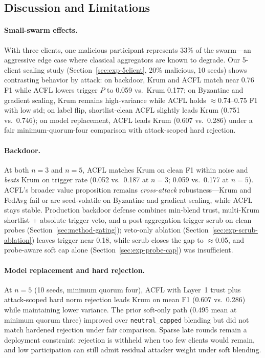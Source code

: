 \subsection{Discussion and Limitations}
\label{sec:exp-limitations}

\paragraph{Small-swarm effects.}
With three clients, one malicious participant represents 33\% of the swarm---an aggressive edge case where classical aggregators are known to degrade.
Our 5-client scaling study (Section~\ref{sec:exp-5client}, 20\% malicious, 10 seeds) shows contrasting behavior by attack: on backdoor, Krum and ACFL match near 0.76 F1 while ACFL lowers trigger $P$ to 0.059 vs.\ Krum 0.177; on Byzantine and gradient scaling, Krum remains high-variance while ACFL holds $\approx$0.74--0.75 F1 with low std; on label flip, shortlist-clean ACFL slightly leads Krum (0.751 vs.\ 0.746); on model replacement, ACFL leads Krum (0.607 vs.\ 0.286) under a fair minimum-quorum-four comparison with attack-scoped hard rejection.

\paragraph{Backdoor.}
At both $n{=}3$ and $n{=}5$, ACFL matches Krum on clean F1 within noise and \emph{beats} Krum on trigger rate (0.052 vs.\ 0.187 at $n{=}3$; 0.059 vs.\ 0.177 at $n{=}5$).
ACFL's broader value proposition remains \emph{cross-attack} robustness---Krum and FedAvg fail or are seed-volatile on Byzantine and gradient scaling, while ACFL stays stable.
Production backdoor defense combines min-blend trust, multi-Krum shortlist + absolute-trigger veto, and a post-aggregation trigger scrub on clean probes (Section~\ref{sec:method-gating}); veto-only ablation (Section~\ref{sec:exp-scrub-ablation}) leaves trigger near 0.18, while scrub closes the gap to $\approx$0.05, and probe-aware soft cap alone (Section~\ref{sec:exp-probe-cap}) was insufficient.

\paragraph{Model replacement and hard rejection.}
At $n{=}5$ (10 seeds, minimum quorum four), ACFL with Layer~1 trust plus attack-scoped hard norm rejection leads Krum on mean F1 (0.607 vs.\ 0.286) while maintaining lower variance.
The prior soft-only path (0.495 mean at minimum quorum three) improved over \texttt{neutral\_capped} blending but did not match hardened rejection under fair comparison.
Sparse late rounds remain a deployment constraint: rejection is withheld when too few clients would remain, and low participation can still admit residual attacker weight under soft blending.

